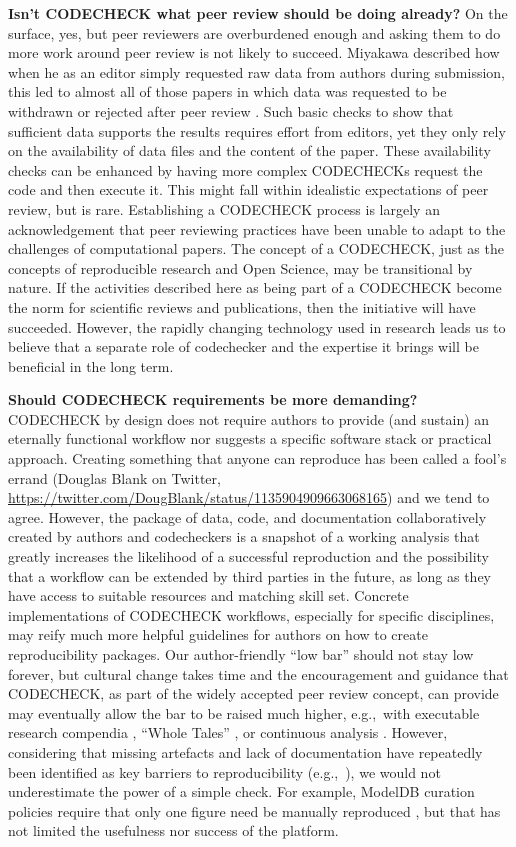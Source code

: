 \documentclass[12pt]{article}
\begin{document}
\textbf{Isn't CODECHECK what peer review should be doing already?}
On the surface, yes, but peer reviewers are overburdened enough and
asking them to do more work around peer review is not likely to
succeed.  Miyakawa described how when he as an editor simply requested
raw data from authors during submission, this led to almost all of
those papers in which data was requested to be withdrawn or rejected
after peer review \cite{miyakawa_no_2020}.  Such basic checks to show
that sufficient data supports the results requires effort from
editors, yet they only rely on the availability of data files and the
content of the paper.  These availability checks can be enhanced by
having more complex CODECHECKs request the code and then execute it.
This might fall within idealistic expectations of peer review, but is
rare.  Establishing a CODECHECK process is largely an acknowledgement
that peer reviewing practices have been unable to adapt to the
challenges of computational papers.  The concept of a CODECHECK, just
as the concepts of reproducible research and Open Science, may be
transitional by nature. If the activities described here as being part
of a CODECHECK become the norm for scientific reviews and
publications, then the initiative will have succeeded. However, the
rapidly changing technology used in research leads us to believe that
a separate role of codechecker and the expertise it brings will be
beneficial in the long term.

\textbf{Should CODECHECK requirements be more demanding?}
CODECHECK by design does not require authors to provide (and sustain)
an eternally functional workflow nor suggests a specific software
stack or practical approach.
Creating something
that anyone can reproduce has been called a fool's
errand (Douglas Blank on Twitter,
\url{https://twitter.com/DougBlank/status/1135904909663068165})
and we tend to agree.  However, the package of data, code, and
documentation collaboratively created by authors and codecheckers is a
snapshot of a working analysis that greatly increases the likelihood
of a successful reproduction and the possibility that a workflow can
be extended by third parties in the future, as long as they have
access to suitable resources and matching skill set.  Concrete
implementations of CODECHECK workflows, especially for specific
disciplines, may reify much more helpful guidelines for authors on how
to create reproducibility packages.  Our author-friendly ``low bar''
should not stay low forever, but cultural change takes time and the
encouragement and guidance that CODECHECK, as part of the widely
accepted peer review concept, can provide may eventually allow the bar
to be raised much higher, e.g.,~with executable research
compendia \cite{nust_opening_2017}, ``Whole Tales''
\cite{brinckman_computing_2018}, or continuous analysis
\cite{beaulieu-jones_reproducibility_2017-1}.  However, considering
that missing artefacts and lack of documentation have repeatedly been
identified as key barriers to reproducibility
(e.g.,~\cite{stagge_assessing_2019,nust_improving_2020}), we would not
underestimate the power of a simple check.  For example, ModelDB
curation policies require that only one figure need be manually reproduced
\cite{mcdougal_reproducibility_2016}, but that has not limited the
usefulness nor success of the platform.
\end{document}
